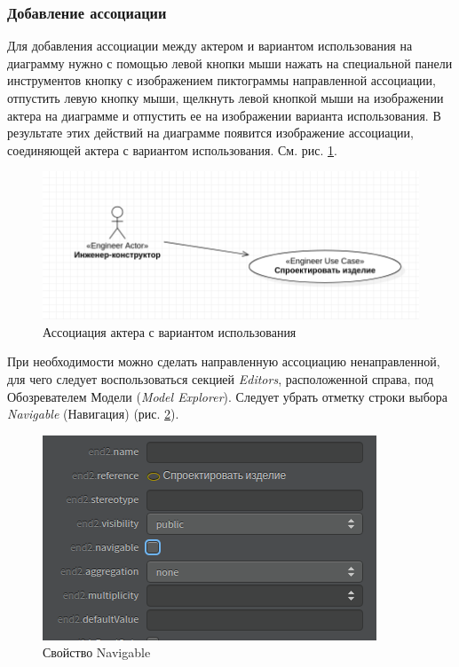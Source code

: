 \documentclass[a4paper,12pt]{report}
\begin{document}
\subsubsection*{Добавление ассоциации}
Для добавления ассоциации между актером и вариантом использования на диаграмму нужно с помощью левой кнопки мыши нажать на специальной панели инструментов кнопку с изображением пиктограммы направленной ассоциации, отпустить левую кнопку мыши, щелкнуть левой кнопкой мыши на изображении актера на диаграмме и отпустить ее на изображении варианта использования. В результате этих действий на диаграмме появится изображение ассоциации, соединяющей актера с вариантом использования. См. рис. \ref{fig:actorwithaction}.
\begin{figure}[h!]
	\centering
	\includegraphics[width=0.8\linewidth]{images/actorwithaction}
	\caption{Ассоциация актера с вариантом использования}
	\label{fig:actorwithaction}
\end{figure}
При необходимости можно сделать направленную ассоциацию ненаправленной, для чего следует воспользоваться секцией \textit{Editors}, расположенной справа, под Обозревателем Модели (\textit{Model Explorer}). Следует убрать отметку строки выбора \textit{Navigable} (Навигация) (рис. \ref{fig:navigable}).
\newpage

\begin{figure}[h!]
	\centering
	\includegraphics[width=0.5\linewidth]{images/navigable}
	\caption{Свойство Navigable}
	\label{fig:navigable}
\end{figure}
\end{document}
